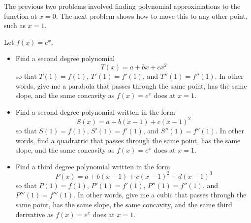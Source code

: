 The previous two problems involved finding polynomial approximations to the function at $x=0$. The next problem shows how to move this to any other point, such as $x=1$. 
\begin{problem} \label{Taylor at 1}
Let $f(x)=e^x$.
\begin{itemize}
\item Find a second degree polynomial $$T(x)=a+bx+cx^2$$ so that $T(1)=f(1)$, $T'(1)=f'(1)$, and $T''(1)=f''(1)$. In other words, give me a parabola that passes through the same point, has the same slope, and the same concavity as $f(x)=e^x$ does at $x=1$. 
\item Find a second degree polynomial written in the form $$S(x)=a+b(x-1)+c(x-1)^2$$ 
	 so that $S(1)=f(1)$, $S'(1)=f'(1)$, and $S''(1)=f''(1)$. In other words, find a quadratric that passes through the same point, has the same slope, and the same concavity as $f(x)=e^x$ does at $x=1$. 
\item Find a third degree polynomial written in the form $$P(x)=a+b(x-1)+c(x-1)^2+d(x-1)^3$$ so that $P(1)=f(1)$, $P'(1)=f'(1)$, $P''(1)=f''(1)$, and $P'''(1)=f'''(1)$. In other words, give me a cubic that passes through the same point, has the same slope, the same concavity, and the same third derivative as $f(x)=e^x$ does at $x=1$. 
\end{itemize}
\end{problem} 


 

